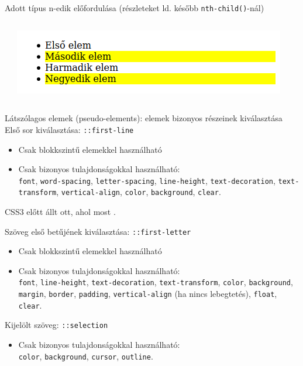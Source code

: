 \begin{frame}
  Adott típus n-edik előfordulása (részleteket ld. később \texttt{nth-child()}-nál)
  \begin{columns}[c]
      \begin{exampleblock}{}
        \scriptsize
        
        
      \end{exampleblock}
      \includegraphics[width=\textwidth]{nthoftype.png}
  \end{columns}
\end{frame}

\begin{frame}
  Látszólagos elemek (pseudo-elements): elemek bizonyos részeinek kiválasztása
  \vfill
  Első sor kiválasztása: \texttt{::first-line}
  \begin{itemize}
    \item Csak blokkszintű elemekkel használható
    \item Csak bizonyos tulajdonságokkal használható: \\ \tiny \texttt{font}, \texttt{word-spacing}, \texttt{letter-spacing}, \texttt{line-height}, \texttt{text-decoration}, \texttt{text-transform}, \texttt{vertical-align}, \texttt{color}, \texttt{background}, \texttt{clear}.
  \end{itemize}
  \vfill
  CSS3 előtt \kiemel{:} állt ott, ahol most \kiemel{::}.
\end{frame}

\begin{frame}
  Szöveg első betűjének kiválasztása: \texttt{::first-letter}
  \begin{itemize}
    \item Csak blokkszintű elemekkel használható
    \item Csak bizonyos tulajdonságokkal használható: \\ \tiny \texttt{font}, \texttt{line-height}, \texttt{text-decoration}, \texttt{text-transform}, \texttt{color}, \texttt{background}, \texttt{margin}, \texttt{border}, \texttt{padding}, \texttt{vertical-align} (ha nincs lebegtetés), \texttt{float}, \texttt{clear}.
  \end{itemize}
  \vfill
  Kijelölt szöveg: \texttt{::selection}
    \begin{itemize}
    \item Csak bizonyos tulajdonságokkal használható: \\ \tiny \texttt{color}, \texttt{background}, \texttt{cursor}, \texttt{outline}.
  \end{itemize}
\end{frame}

